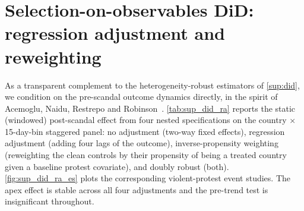 \documentclass[11pt]{article}
\begin{document}

\clearpage
\section{Selection-on-observables DiD: regression adjustment and reweighting}\label{sup:did_ra}

As a transparent complement to the heterogeneity-robust estimators of \autoref{sup:did}, we condition on the pre-scandal outcome dynamics directly, in the spirit of Acemoglu, Naidu, Restrepo and Robinson~\citep{acemoglu2019DemoEcoGrowth}. \autoref{tab:sup_did_ra} reports the static (windowed) post-scandal effect from four nested specifications on the country $\times$ 15-day-bin staggered panel: no adjustment (two-way fixed effects), regression adjustment (adding four lags of the outcome), inverse-propensity weighting (reweighting the clean controls by their propensity of being a treated country given a baseline protest covariate), and doubly robust (both). \autoref{fig:sup_did_ra_es} plots the corresponding violent-protest event studies. The apex effect is stable across all four adjustments and the pre-trend test is insignificant throughout.
\end{document}
